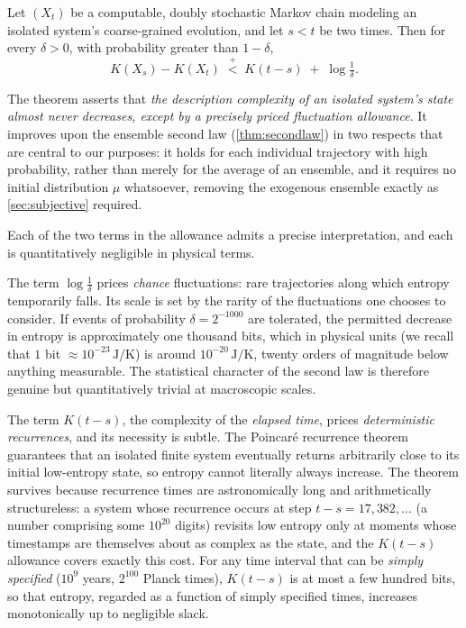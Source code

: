 \documentclass[11pt]{article}
\newcommand{\plt}{\mathrel{\stackrel{+}{<}}}
\begin{document}
\begin{theorem}
\label{thm:algsecond}
Let $(X_t)$ be a computable, doubly stochastic Markov chain modeling an isolated system's coarse-grained evolution, and let $s < t$ be two times. Then for every $\delta > 0$, with probability greater than $1 - \delta$,
\[
K(X_s) - K(X_t) \;\plt\; K(t - s) \;+\; \log \tfrac1\delta .
\]
\end{theorem}

The theorem asserts that \emph{the description complexity of an isolated system's state almost never decreases, except by a precisely priced fluctuation allowance}. It improves upon the ensemble second law (\cref{thm:secondlaw}) in two respects that are central to our purposes: it holds for each individual trajectory with high probability, rather than merely for the average of an ensemble, and it requires no initial distribution $\mu$ whatsoever, removing the exogenous ensemble exactly as \cref{sec:subjective} required.

Each of the two terms in the allowance admits a precise interpretation, and each is quantitatively negligible in physical terms.

The term $\log\frac1\delta$ prices \emph{chance} fluctuations: rare trajectories along which entropy temporarily falls. Its scale is set by the rarity of the fluctuations one chooses to consider. If events of probability $\delta = 2^{-1000}$ are tolerated, the permitted decrease in entropy is approximately one thousand bits, which in physical units (we recall that $1$ bit $\approx 10^{-23}\,\mathrm{J/K}$) is around $10^{-20}\,\mathrm{J/K}$, twenty orders of magnitude below anything measurable. The statistical character of the second law is therefore genuine but quantitatively trivial at macroscopic scales.

The term $K(t-s)$, the complexity of the \emph{elapsed time}, prices \emph{deterministic recurrences}, and its necessity is subtle. The Poincar\'e recurrence theorem guarantees that an isolated finite system eventually returns arbitrarily close to its initial low-entropy state, so entropy cannot literally always increase. The theorem survives because recurrence times are astronomically long and arithmetically structureless: a system whose recurrence occurs at step $t - s = 17{,}382{,}\dots$ (a number comprising some $10^{20}$ digits) revisits low entropy only at moments whose timestamps are themselves about as complex as the state, and the $K(t-s)$ allowance covers exactly this cost. For any time interval that can be \emph{simply specified} ($10^9$ years, $2^{100}$ Planck times), $K(t-s)$ is at most a few hundred bits, so that entropy, regarded as a function of simply specified times, increases monotonically up to negligible slack.
\end{document}

